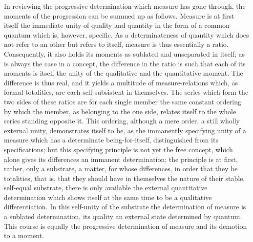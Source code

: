 In reviewing the progressive determination
which measure has gone through,
the moments of the progression can be summed up as follows.
Measure is at first itself
the immediate unity of quality and quantity
in the form of a common quantum
which is, however, specific.
As a determinateness of quantity
which does not refer to an other but refers to itself,
measure is thus essentially a ratio.
Consequently, it also holds its moments
as sublated and unseparated in itself;
as is always the case in a concept,
the difference in the ratio is such
that each of its moments is itself the unity of
the qualitative and the quantitative moment.
The difference is thus real,
and it yields a multitude of measure-relations
which, as formal totalities,
are each self-subsistent in themselves.
The series which form the two sides of these ratios
are for each single member the same constant ordering
by which the member, as belonging to the one side,
relates itself to the whole series standing opposite it.
This ordering, although a mere order,
a still wholly external unity,
demonstrates itself to be,
as the immanently specifying unity of a measure
which has a determinate being-for-itself,
distinguished from its specifications;
but this specifying principle is not yet the free concept,
which alone gives its differences an immanent determination;
the principle is at first, rather, only a substrate,
a matter, for whose differences, in order that they be totalities,
that is, that they should have in themselves the nature
of their stable, self-equal substrate,
there is only available the external quantitative determination
which shows itself at the same time to be a qualitative differentiation.
In this self-unity of the substrate
the determination of measure is a sublated determination,
its quality an external state determined by quantum.
This course is equally the progressive determination
of measure and its demotion to a moment.
